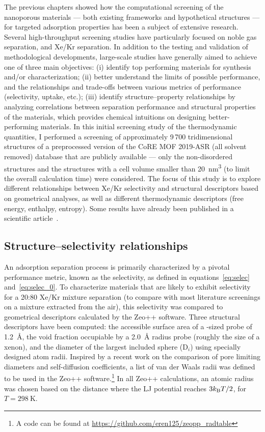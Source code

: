 \documentclass[main.tex]{subfiles}
\begin{document}
The previous chapters showed how the computational screening of the nanoporous materials --- both existing frameworks and hypothetical structures --- for targeted adsorption properties has been a subject of extensive research. Several high-throughput screening studies have particularly focused on noble gas separation, and Xe/Kr separation. In addition to the testing and validation of methodological developments, large-scale studies have generally aimed to achieve one of three main objectives: (i) identify top performing materials for synthesis and/or characterization; (ii) better understand the limits of possible performance, and the relationships and trade-offs between various metrics of performance (selectivity, uptake, etc.); (iii) identify structure--property relationships by analyzing correlations between separation performance and structural properties of the materials, which provides chemical intuitions on designing better-performing materials. In this initial screening study of the thermodynamic quantities, I performed a screening of approximately 9\,700 tridimensional structures of a preprocessed version of the CoRE MOF 2019-ASR (all solvent removed) database that are publicly available --- only the non-disordered structures and the structures with a cell volume smaller than \SI{20}{\nano\meter\cubed} (to limit the overall calculation time) were considered. The focus of this study is to explore different relationships between Xe/Kr selectivity and structural descriptors based on geometrical analyses, as well as different thermodynamic descriptors (free energy, enthalpy, entropy). Some results have already been published in a scientific article~\cite{Ren_2021}.

\subsection{Structure--selectivity relationships}\label{sct:geometry}

An adsorption separation process is primarily characterized by a pivotal performance metric, known as the selectivity, as defined in equations~\ref{eq:selec} and~\ref{eq:selec_0}. To characterize materials that are likely to exhibit selectivity for a 20:80 Xe/Kr mixture separation (to compare with most literature screenings on a mixture extracted from the air), this selectivity was compared to geometrical descriptors calculated by the Zeo++ software\autocite{Zeo++}. Three structural descriptors have been computed: the accessible surface area of a -sized probe of \SI{1.2}{\angstrom}, the void fraction occupiable by a \SI{2.0}{\angstrom} radius probe (roughly the size of a xenon),\autocite{vol_Ongari2017} and the diameter of the largest included sphere (D$_i$) using specially designed atom radii. Inspired by a recent work on the comparison of pore limiting diameters and self-diffusion coefficients,\autocite{Hung_2021} a list of van der Waals radii was defined to be used in the Zeo++ software.\footnote[1]{A code can be found at \url{https://github.com/eren125/zeopp_radtable}} In all Zeo++ calculations, an atomic radius was chosen based on the distance where the LJ potential reaches $3 k_{\text{B}} T/2$, for $T = \SI{298}{\kelvin}$.
\end{document}
